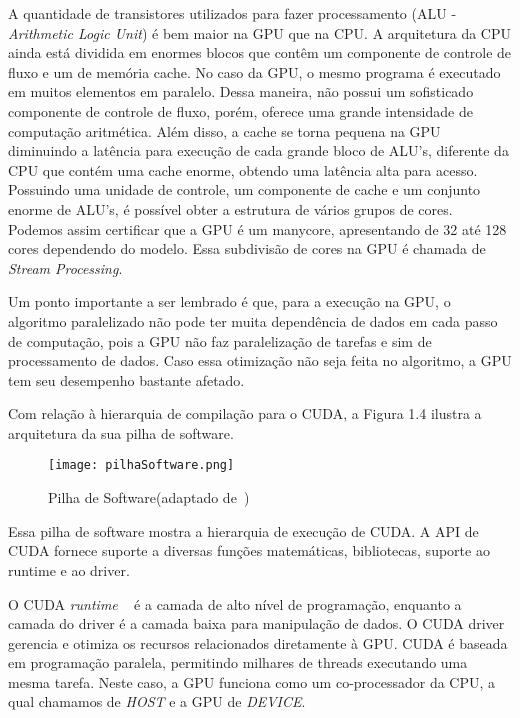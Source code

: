 A quantidade de transistores utilizados para fazer processamento (ALU - \textit{Arithmetic Logic Unit}) é bem maior na GPU que na CPU. A arquitetura da CPU ainda está dividida em enormes blocos que contêm um componente de controle de fluxo e um de memória cache. No caso da GPU, o mesmo programa é executado em muitos elementos em paralelo. Dessa maneira, não possui um sofisticado componente de controle de fluxo, porém, oferece uma grande intensidade de computação aritmética. Além disso, a cache se torna pequena na GPU diminuindo a latência para execução de cada grande bloco de ALU's, diferente da CPU que contém uma cache enorme, obtendo uma latência alta para acesso. Possuindo uma unidade de controle, um componente de cache e um conjunto enorme de ALU's, é possível obter a estrutura de vários grupos de
cores. Podemos assim certificar que a GPU é um manycore, apresentando de 32 até 128 cores dependendo do modelo. Essa subdivisão de cores na GPU é chamada de \textit{Stream Processing}.

Um ponto importante a ser lembrado é que, para a execução na GPU, o algoritmo paralelizado não pode ter muita dependência de dados em cada passo de computação, pois a GPU não faz paralelização de tarefas e sim de processamento de dados. Caso essa otimização não seja feita no algoritmo, a GPU tem seu desempenho bastante afetado.

Com relação à hierarquia de compilação para o CUDA, a Figura 1.4 ilustra a arquitetura da sua pilha de software.

\begin{figure}[!htb]
	\begin{center}
	\centering
			\texttt{[image: pilhaSoftware.png]}
	\label{fig: pilhaSoftware}
	\caption{Pilha de Software(adaptado de~\citep{cuda})}
	\end{center}
\end{figure}

Essa pilha de software mostra a hierarquia de execução de CUDA. A API de CUDA fornece suporte a diversas funções matemáticas, bibliotecas, suporte ao runtime e ao driver.

O CUDA \textit{runtime} ~\citep{cuda} é a camada de alto nível de programação, enquanto a camada do driver é a camada baixa para manipulação de dados. O CUDA driver gerencia e otimiza os recursos relacionados diretamente à GPU. CUDA é baseada em programação paralela, permitindo milhares de threads executando uma mesma tarefa. Neste caso, a GPU funciona como um co-processador da CPU, a qual chamamos de \textit{HOST} e a GPU de \textit{DEVICE}.

